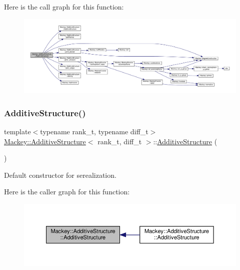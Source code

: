Here is the call graph for this function\+:\nopagebreak
\begin{figure}[H]
\begin{center}
\leavevmode
\includegraphics[width=350pt]{classMackey_1_1AdditiveStructure_a6e6b98b9df433129320045abd5e50bab_cgraph}
\end{center}
\end{figure}
\mbox{\label{classMackey_1_1AdditiveStructure_afd2b48da3942beba407b3add7ceb9b63}} 
\subsubsection{\texorpdfstring{Additive\+Structure()}{AdditiveStructure()}\hspace{0.1cm}{\footnotesize\ttfamily [2/2]}}
{\footnotesize\ttfamily template$<$typename rank\+\_\+t, typename diff\+\_\+t$>$ \\
\hyperlink{classMackey_1_1AdditiveStructure}{Mackey\+::\+Additive\+Structure}$<$ rank\+\_\+t, diff\+\_\+t $>$\+::\hyperlink{classMackey_1_1AdditiveStructure}{Additive\+Structure} (\begin{DoxyParamCaption}{ }\end{DoxyParamCaption})\hspace{0.3cm}{\ttfamily [inline]}}



Default constructor for serealization. 

Here is the caller graph for this function\+:\nopagebreak
\begin{figure}[H]
\begin{center}
\leavevmode
\includegraphics[width=350pt]{classMackey_1_1AdditiveStructure_afd2b48da3942beba407b3add7ceb9b63_icgraph}
\end{center}
\end{figure}


